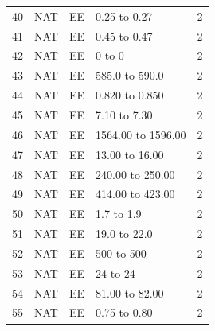 \documentclass[a4paper,10pt]{exam}
\theoremstyle{remark}
\begin{document}
\begin{enumerate}
\begin{table}[ht]
\begin{tabular}{|c|c|c|l|c|}
40 & NAT & EE & 0.25 to 0.27        & 2 \\
41 & NAT & EE & 0.45 to 0.47        & 2 \\
42 & NAT & EE & 0 to 0              & 2 \\
43 & NAT & EE & 585.0 to 590.0      & 2 \\
44 & NAT & EE & 0.820 to 0.850      & 2 \\
45 & NAT & EE & 7.10 to 7.30        & 2 \\
46 & NAT & EE & 1564.00 to 1596.00  & 2 \\
47 & NAT & EE & 13.00 to 16.00      & 2 \\
48 & NAT & EE & 240.00 to 250.00    & 2 \\
49 & NAT & EE & 414.00 to 423.00    & 2 \\
50 & NAT & EE & 1.7 to 1.9          & 2 \\
51 & NAT & EE & 19.0 to 22.0        & 2 \\
52 & NAT & EE & 500 to 500          & 2 \\
53 & NAT & EE & 24 to 24            & 2 \\
54 & NAT & EE & 81.00 to 82.00      & 2 \\
55 & NAT & EE & 0.75 to 0.80        & 2 \\
\hline
\end{tabular}
\end{table}


\end{enumerate}
\end{document}
